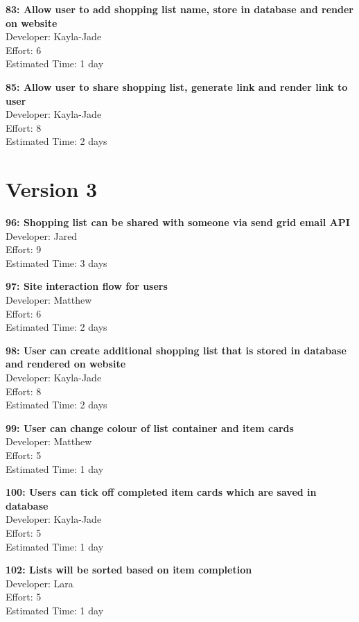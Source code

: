\documentclass[10pt,onecolumn]{witseiepaper}
\begin{document}
\textbf{83: Allow user to add shopping list name, store in database and render on website} \\
Developer: Kayla-Jade\\
Effort: 6\\
Estimated Time: 1 day

\textbf{85: Allow user to share shopping list, generate link and render link to user} \\
Developer: Kayla-Jade\\
Effort: 8\\
Estimated Time: 2 days
\section*{Version 3}

\textbf{96: Shopping list can be shared with someone via send grid email API} \\
Developer: Jared\\
Effort: 9\\
Estimated Time: 3 days

\textbf{97: Site interaction flow for users} \\
Developer: Matthew\\
Effort: 6\\
Estimated Time: 2 days
%

\textbf{98: User can create additional shopping list that is stored in database and rendered on website} \\
Developer: Kayla-Jade\\
Effort: 8\\
Estimated Time: 2 days

\textbf{99: User can change colour of list container and item cards} \\
Developer: Matthew\\
Effort: 5\\
Estimated Time: 1 day

\textbf{100: Users can tick off completed item cards which are saved in database} \\
Developer: Kayla-Jade\\
Effort: 5\\
Estimated Time: 1 day

\textbf{102: Lists will be sorted based on item completion} \\
Developer: Lara\\
Effort: 5\\
Estimated Time: 1 day
\end{document}
